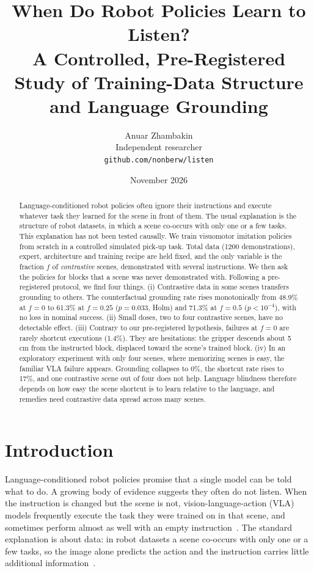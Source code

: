 \documentclass[11pt]{article}
\title{When Do Robot Policies Learn to Listen?\\[0.3em]
\large A Controlled, Pre-Registered Study of Training-Data Structure and Language Grounding}
\author{Anuar Zhambakin\\\small Independent researcher\\\small\texttt{github.com/nonberw/listen}}
\date{November 2026}
\begin{document}
\maketitle

\begin{abstract}
Language-conditioned robot policies often ignore their instructions and execute whatever
task they learned for the scene in front of them. The usual explanation is the structure of robot
datasets, in which a scene co-occurs with only one or a few tasks. This explanation has not been
tested causally. We train visuomotor imitation policies from scratch in a controlled simulated
pick-up task. Total data (1200 demonstrations), expert, architecture and training recipe are held
fixed, and the only variable is the fraction $f$ of \emph{contrastive} scenes, demonstrated with
several instructions. We then ask the policies for blocks that a scene was never demonstrated
with. Following a pre-registered protocol, we find four things. (i) Contrastive data in some
scenes transfers grounding to others. The counterfactual grounding rate rises monotonically from
48.9\% at $f{=}0$ to 61.3\% at $f{=}0.25$ ($p{=}0.033$, Holm) and 71.3\% at $f{=}0.5$
($p{<}10^{-4}$), with no loss in nominal success. (ii) Small doses, two to four contrastive scenes,
have no detectable effect. (iii) Contrary to our pre-registered hypothesis, failures at $f{=}0$
are rarely shortcut executions (1.4\%). They are hesitations: the gripper descends about 5\,cm from
the instructed block, displaced toward the scene's trained block. (iv) In an exploratory
experiment with only four scenes, where memorizing scenes is easy, the familiar VLA failure
appears. Grounding collapses to 0\%, the shortcut rate rises to 17\%, and one contrastive scene
out of four does not help. Language blindness therefore depends on how easy the scene shortcut is
to learn relative to the language, and remedies need contrastive data spread across many scenes.
\end{abstract}

\section{Introduction}

Language-conditioned robot policies promise that a single model can be told what to do. A
growing body of evidence suggests they often do not listen. When the instruction is changed but
the scene is not, vision-language-action (VLA) models frequently execute the task they were
trained on in that scene, and sometimes perform almost as well with an empty
instruction~\citep{fei2025liberoplus,zhou2025liberopro,fang2026vision,jiang2026encoded}. The
standard explanation is about data: in robot datasets a scene co-occurs with only one or a few
tasks, so the image alone predicts the action and the instruction carries little additional
information~\citep{fang2026vision,jiang2026encoded}.
\end{document}
